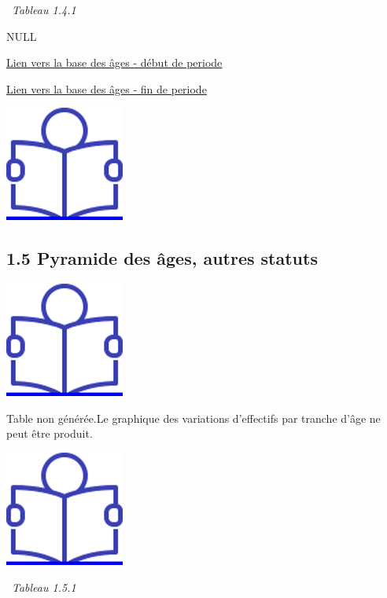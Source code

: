 \newpage

~\emph{Tableau 1.4.1}

NULL

\href{../Bases/Effectifs/Pyramide-des-ages-des-non-titulaires_2009.csv}{Lien
vers la base des âges - début de periode}

\href{../Bases/Effectifs/Pyramide-des-ages-des-non-titulaires_2013.csv}{Lien
vers la base des âges - fin de periode}

\href{../Docs/Notices/fiche_1.odt}{\includegraphics{icones/Notice.png}}

\hypertarget{pyramide-des-ages-autres-statuts}{%
\subsection{1.5 Pyramide des âges, autres statuts
~}\label{pyramide-des-ages-autres-statuts}}

\href{../Docs/Notices/fiche_2.odt}{\includegraphics{icones/Notice.png}}

Table non générée.\newpage Le graphique des variations d'effectifs par
tranche d'âge ne peut être produit.

\href{../Docs/Notices/fiche_3.odt}{\includegraphics{icones/Notice.png}}

\newpage

~\emph{Tableau 1.5.1}

